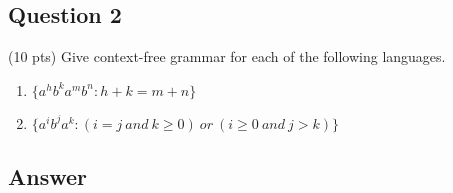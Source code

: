 \newpage
\subsection*{Question 2}

(10 pts) Give context-free grammar for each of the following languages. 
    
    \begin{enumerate}[label={(\alph*)}]
        \item $\{a^h b^k a^m b^n : h + k = m + n\}$
        \item $\{a^i b^j a^k : (i = j \: and \: k \geq 0) \: or \: (i \geq 0 \: and \: j > k)\}$
    \end{enumerate}


\subsection*{Answer}

